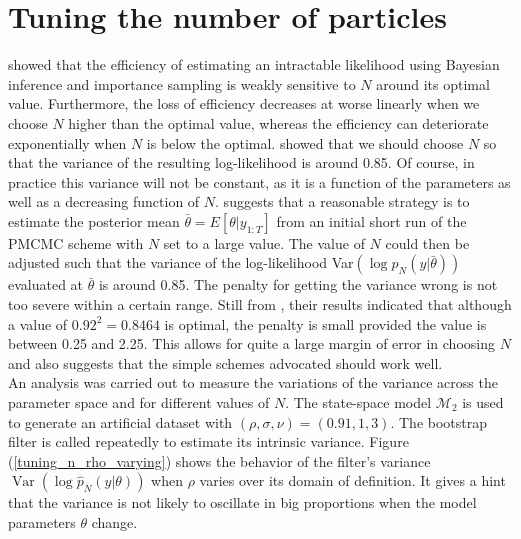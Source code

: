 \documentclass[11pt,a4,twosided,singlespacing,titlepagenumber=on]{scrreprt}
\numberwithin{equation}{chapter} %
\theoremstyle{remark}
\DeclareMathOperator{\var}{Var}
\begin{document}
\section{Tuning the number of particles}
\label{sec:tuning_n}
\cite{tran2014} showed that the efficiency of estimating an intractable likelihood using Bayesian inference and importance sampling is weakly sensitive to $N$ around its optimal value. Furthermore, the loss of efficiency decreases at worse linearly when we choose $N$ higher than the optimal value, whereas
the efficiency can deteriorate exponentially when $N$ is below the optimal. \cite{pitt2012} showed that we should choose $N$ so that the variance of the resulting log-likelihood is around 0.85. Of course, in practice this variance will not be constant, as it is a function of the parameters as well as a decreasing function of $N$. \cite{pitt2012} suggests that a reasonable strategy is to estimate the posterior mean $\bar{\theta} = E[\theta|y_{1:T}]$ from an initial short run of the PMCMC scheme with $N$ set to a large value. The value of $N$ could then be adjusted such that the variance of the log-likelihood Var$(\log p_N(y|\bar{\theta}))$ evaluated at $\bar{\theta}$ is around 0.85. The penalty for getting the variance wrong is not too severe within a certain range. Still from \cite{pitt2012}, their results indicated that although a value of $0.92^2 = 0.8464$ is optimal, the penalty is small provided the value is between 0.25 and 2.25. This allows for quite a large margin of error in choosing $N$ and also suggests that the simple schemes advocated should work well. \\
An analysis was carried out to measure the variations of the variance across the parameter space and for different values of $N$. The state-space model $\mathcal{M}_2$ is used to generate an artificial dataset with $(\rho,\sigma,\nu) = (0.91,1,3)$. The bootstrap filter is called repeatedly to estimate its intrinsic variance. Figure (\ref{tuning_n_rho_varying}) shows the behavior of the filter's variance $\var(\log \hat{p}_N(y|\theta))$ when $\rho$ varies over its domain of definition. It gives a hint that the variance is not likely to oscillate in big proportions when the model parameters $\theta$ change. \\
\end{document}
